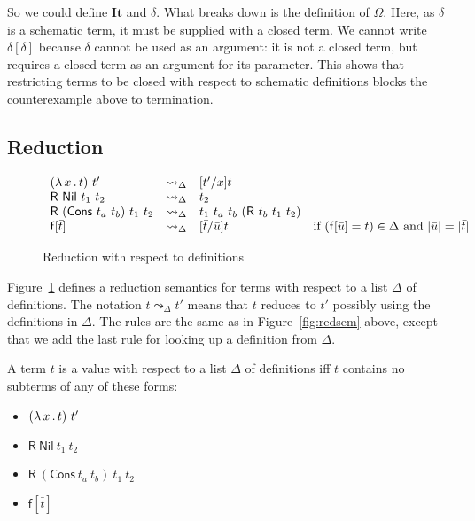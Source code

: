 \documentclass{article}
\begin{document}
So we could define $\mathbf{It}$ and $\delta$.  What breaks down is
the definition of $\Omega$.  Here, as $\delta$ is a schematic term, it
must be supplied with a closed term.  We cannot write $\delta[\delta]$
because $\delta$ cannot be used as an argument: it is not a closed
term, but requires a closed term as an argument for its parameter.
This shows that restricting terms to be closed with respect to
schematic definitions blocks the counterexample above to termination.

\subsection{Reduction}

\begin{figure}
  \[
  \begin{array}{llll}
    (\lam{x}{t})\ t' & \leadsto_\Delta & [t'/x]t &\ \\
    \mathsf{R}\ \mathsf{Nil}\ t_1\ t_2 & \leadsto_\Delta & t_2 &\ \\
    \mathsf{R}\ (\mathsf{Cons}\ t_a\ t_b)\ t_1\ t_2 & \leadsto_\Delta & t_1\ t_a\ t_b\ (\mathsf{R}\ t_b\ t_1\ t_2) &\ \\
    \mathsf{f}[\bar{t}] & \leadsto_\Delta & [\bar{t}/\bar{u}]t & \textnormal{if }(\mathsf{f}[\bar{u}] = t) \in \Delta \textnormal{ and }
    |\bar{u}| = |\bar{t}|
  \end{array}
  \]
  \caption{Reduction with respect to definitions}
  \label{fig:sarred}
\end{figure}

Figure~\ref{fig:sarred} defines a reduction semantics for terms with
respect to a list $\Delta$ of definitions.  The notation $t \leadsto_\Delta t'$ means
that $t$ reduces to $t'$ possibly using the definitions in $\Delta$.  The rules are the same as in
Figure~\ref{fig:redsem} above, except that we add the last rule for
looking up a definition from $\Delta$.  


\begin{definition}
  A term $t$ is a value with respect to a list $\Delta$ of definitions iff $t$ contains no subterms of any of these forms:
  \begin{itemize}
  \item $(\lambda\, x\, .\, t)\ t'$
  \item $\mathsf{R}\ \mathsf{Nil}\ t_1\ t_2$
  \item $\mathsf{R}\ (\mathsf{Cons}\ t_a\ t_b)\ t_1\ t_2$
  \item $\mathsf{f}[\bar{t}]$
  \end{itemize}
\end{definition}
\end{document}
